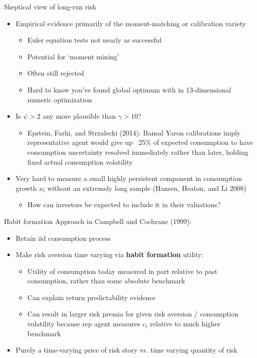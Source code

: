 \documentclass[xcolor=table, aspectratio=169]{beamer}
\newcommand{\alertbf}[1]{\alert{\textbf{#1}}}
\begin{document}
\begin{frame}{Skeptical view of long-run risk}
\begin{itemize}
\item Empirical evidence primarily of the moment-matching or calibration variety
\begin{itemize}
\item Euler equation tests not nearly as successful
\item Potential for `moment mining'
\item Often still rejected
\item Hard to know you've found global optimum with in 13-dimensional numeric optimization
\end{itemize}
\item Is $\psi > 2$ any more plausible than $\gamma > 10$?
\begin{itemize}
    \item Epstein, Farhi, and Strzalecki (2014): Bansal Yaron calibrations imply representative agent would give up ~25\% of expected consumption to have consumption uncertainty resolved immediately rather than later, holding fixed actual consumption volatility
\end{itemize}
\item Very hard to measure a small highly persistent component in consumption growth $x_t$ without an extremely long sample (Hansen, Heaton, and Li 2008)
\begin{itemize}
    \item How can investors be expected to include it in their valuations?
\end{itemize} 
\end{itemize}
\end{frame}


\begin{frame}{Habit formation}
Approach in Campbell and Cochrane (1999):
\begin{itemize}
\item Retain iid consumption process
\item Make risk aversion time varying via \alertbf{habit formation} utility:
\begin{itemize}
\item Utility of consumption today measured in part relative to past consumption, rather than some absolute benchmark
\item Can explain return predictability evidence
\item Can result in larger risk premia for given risk aversion / consumption volatility because rep agent measures $c_t$ relative to much higher benchmark
\end{itemize}
\item Purely a time-varying price of risk story vs. time varying quantity of risk 
\end{itemize}
\end{frame}
\end{document}
